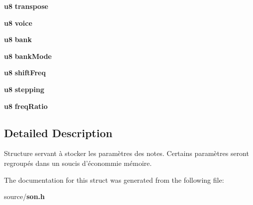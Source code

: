 \begin{DoxyCompactItemize}
\item 
{\bf u8} {\bfseries transpose}\label{struct_n_o_t_e_a841401a367ef1cd53370b5c66363bdc9}

\item 
{\bf u8} {\bfseries voice}\label{struct_n_o_t_e_a0af6566811dd31ae4578f0f5142729d8}

\item 
{\bf u8} {\bfseries bank}\label{struct_n_o_t_e_ae9087a1e8528e390f174471c43a4c532}

\item 
{\bf u8} {\bfseries bankMode}\label{struct_n_o_t_e_acae530e7f33a24ba9f63b81e8f618366}

\item 
{\bf u8} {\bfseries shiftFreq}\label{struct_n_o_t_e_aae314270ce00a31d9c9e6d814fdd4ded}

\item 
{\bf u8} {\bfseries stepping}\label{struct_n_o_t_e_a373059cf61dde205283d1855b3e1f697}

\item 
{\bf u8} {\bfseries freqRatio}\label{struct_n_o_t_e_a28b2892088941c6bc6fcce923ce2e413}

\end{DoxyCompactItemize}


\subsection{Detailed Description}
Structure servant à stocker les paramètres des notes. Certains paramètres seront regroupés dans un soucis d'économmie mémoire. 

The documentation for this struct was generated from the following file:\begin{DoxyCompactItemize}
\item 
source/{\bf son.h}\end{DoxyCompactItemize}
